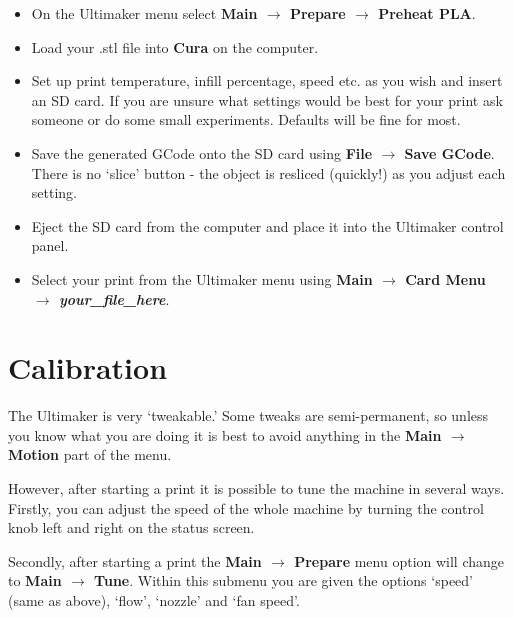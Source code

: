 \documentclass[a4paper,12pt]{article}
\begin{document}
\begin{itemize}
  \item On the Ultimaker menu select \textbf{Main $\rightarrow$ Prepare $\rightarrow$ Preheat PLA}.
  \item Load your .stl file into \textbf{Cura} on the computer.
  \item Set up print temperature, infill percentage, speed etc. as you wish and insert an SD card. If you are unsure what
  settings would be best for your print ask someone or do some small experiments. Defaults will be fine for most.
  \item Save the generated GCode onto the SD card using \textbf{File $\rightarrow$ Save GCode}. There is no `slice' button - the object is resliced (quickly!) as you adjust each setting.
  \item Eject the SD card from the computer and place it into the Ultimaker control panel.
  \item Select your print from the Ultimaker menu using \textbf{Main $\rightarrow$ Card Menu $\rightarrow$ \textit{your\_file\_here}}.
  
\end{itemize}

\section*{Calibration}
The Ultimaker is very `tweakable.' Some tweaks are semi-permanent, so unless you know what you are doing it is best to avoid anything in
the \textbf{Main $\rightarrow$ Motion} part of the menu.


However, after starting a print it is possible to tune the machine in several ways. Firstly, you can adjust the speed of the whole machine by turning the control knob left and right on the status screen. 

Secondly, after starting a print the \textbf{Main $\rightarrow$ Prepare} menu option will change to \textbf{Main $\rightarrow$ Tune}. Within this submenu you are given the options `speed' (same as above), `flow', `nozzle' and `fan speed'.
\end{document}
